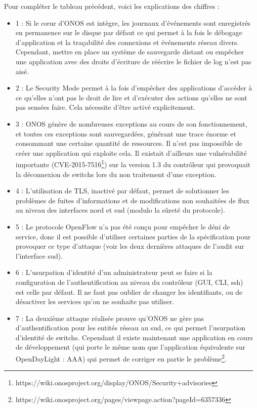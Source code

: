 Pour compléter le tableau précédent, voici les explications des chiffres :
\begin{itemize}
\item 1 : Si le cœur d'ONOS est intègre, les journaux d'événements sont enregistrés en permanence sur le disque par défaut ce qui permet à la fois le débogage d'application et la traçabilité des connexions et événements réseau divers. Cependant, mettre en place un système de sauvegarde distant ou empêcher une application avec des droits d'écriture de réécrire le fichier de log n'est pas aisé.
\item 2 : Le Security Mode permet à la fois d'empêcher des applications d'accéder à ce qu'elles n'ont pas le droit de lire et d'exécuter des actions qu'elles ne sont pas sensées faire. Cela nécessite d’être activé explicitement.
\item 3 : ONOS génère de nombreuses exceptions au cours de son fonctionnement, et toutes ces exceptions sont sauvegardées, générant une trace énorme et consommant une certaine quantité de ressources. Il n'est pas impossible de créer une application qui exploite cela. Il existait d'ailleurs une vulnérabilité importante (CVE-2015-7516\footnote{https://wiki.onosproject.org/display/ONOS/Security+advisories}) sur la version 1.3 du contrôleur qui provoquait la déconnexion de switchs lors du non traitement d'une exception.
\item 4 : L'utilisation de TLS, inactivé par défaut, permet de solutionner les problèmes de fuites d'informations et de modifications non souhaitées de flux au niveau des interfaces nord et sud (modulo la sûreté du protocole).
\item 5 : Le protocole OpenFlow n'a pas été conçu pour empêcher le déni de service, donc il est possible d'utiliser certaines parties de la spécification pour provoquer ce type d'attaque (voir les deux dernières attaques de l'audit sur l'interface sud).
\item 6 : L'usurpation d'identité d'un administrateur peut se faire si la configuration de l'authentification au niveau du contrôleur (GUI, CLI, ssh) est celle par défaut. Il ne faut pas oublier de changer les identifiants, ou de désactiver les services qu'on ne souhaite pas utiliser.
\item 7 : La deuxième attaque réalisée prouve qu'ONOS ne gère pas d'authentification pour les entités réseau au sud, ce qui permet l'usurpation d'identité de switchs. Cependant il existe maintenant une application en cours de développement (qui porte le même nom que l'application équivalente sur OpenDayLight : AAA) qui permet de corriger en partie le problème\footnote{https://wiki.onosproject.org/pages/viewpage.action?pageId=6357336}.
\end{itemize}